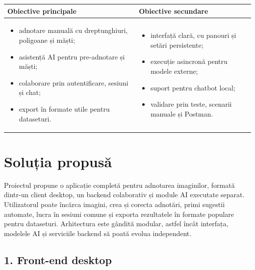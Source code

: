 \documentclass[10pt,a4paper]{article}
\begin{document}
\begin{center}
\small
\begin{tabular}{|p{}|p{}|}
    \hline
    \textbf{Obiective principale} & \textbf{Obiective secundare} \\
    \hline
    \begin{minipage}[t]{0.45\textwidth}
    \begin{itemize}
        \item adnotare manuală cu dreptunghiuri, poligoane și măști;
        \item asistență AI pentru pre-adnotare și măști;
        \item colaborare prin autentificare, sesiuni și chat;
        \item export în formate utile pentru dataseturi.
    \end{itemize}
    \end{minipage}
    &
    \begin{minipage}[t]{0.45\textwidth}
    \begin{itemize}
        \item interfață clară, cu panouri și setări persistente;
        \item execuție asincronă pentru modele externe;
        \item suport pentru chatbot local;
        \item validare prin teste, scenarii manuale și Postman.
    \end{itemize}
    \end{minipage} \\
    \hline
\end{tabular}
\end{center}

\section*{Soluția propusă}

\hspace*{2em}Proiectul propune o aplicație completă pentru adnotarea imaginilor, formată dintr-un client desktop, un backend colaborativ și module AI executate separat. Utilizatorul poate încărca imagini, crea și corecta adnotări, primi sugestii automate, lucra în sesiuni comune și exporta rezultatele în formate populare pentru dataseturi. Arhitectura este gândită modular, astfel încât interfața, modelele AI și serviciile backend să poată evolua independent.

\subsection*{1. Front-end desktop}
\end{document}
